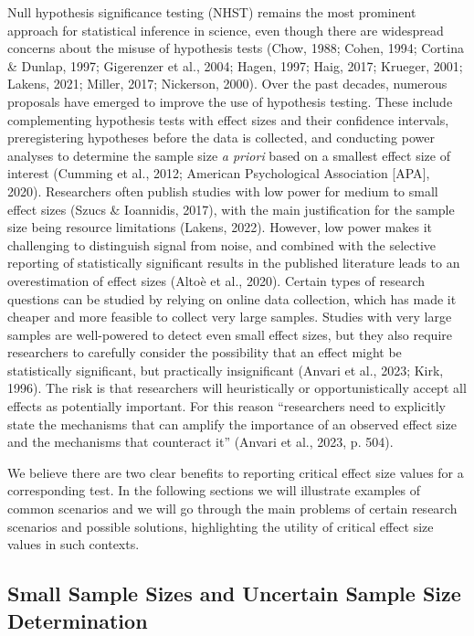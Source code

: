 \documentclass[
  man,floatsintext]{apa7}
\begin{document}
Null hypothesis significance testing (NHST) remains the most prominent approach for statistical inference in science, even though there are widespread concerns about the misuse of hypothesis tests (Chow, 1988; Cohen, 1994; Cortina \& Dunlap, 1997; Gigerenzer et al., 2004; Hagen, 1997; Haig, 2017; Krueger, 2001; Lakens, 2021; Miller, 2017; Nickerson, 2000). Over the past decades, numerous proposals have emerged to improve the use of hypothesis testing. These include complementing hypothesis tests with effect sizes and their confidence intervals, preregistering hypotheses before the data is collected, and conducting power analyses to determine the sample size \textit{a priori} based on a smallest effect size of interest (Cumming et al., 2012; American Psychological Association {[}APA{]}, 2020). Researchers often publish studies with low power for medium to small effect sizes (Szucs \& Ioannidis, 2017), with the main justification for the sample size being resource limitations (Lakens, 2022). However, low power makes it challenging to distinguish signal from noise, and combined with the selective reporting of statistically significant results in the published literature leads to an overestimation of effect sizes (Altoè et al., 2020). Certain types of research questions can be studied by relying on online data collection, which has made it cheaper and more feasible to collect very large samples. Studies with very large samples are well-powered to detect even small effect sizes, but they also require researchers to carefully consider the possibility that an effect might be statistically significant, but practically insignificant (Anvari et al., 2023; Kirk, 1996). The risk is that researchers will heuristically or opportunistically accept all effects as potentially important. For this reason ``researchers need to explicitly state the mechanisms that can amplify the importance of an observed effect size and the mechanisms that counteract it'' (Anvari et al., 2023, p. 504).

We believe there are two clear benefits to reporting critical effect size values for a corresponding test. In the following sections we will illustrate examples of common scenarios and we will go through the main problems of certain research scenarios and possible solutions, highlighting the utility of critical effect size values in such contexts.

\hypertarget{small-sample-sizes-and-uncertain-sample-size-determination}{%
\subsection{Small Sample Sizes and Uncertain Sample Size Determination}\label{small-sample-sizes-and-uncertain-sample-size-determination}}
\end{document}
